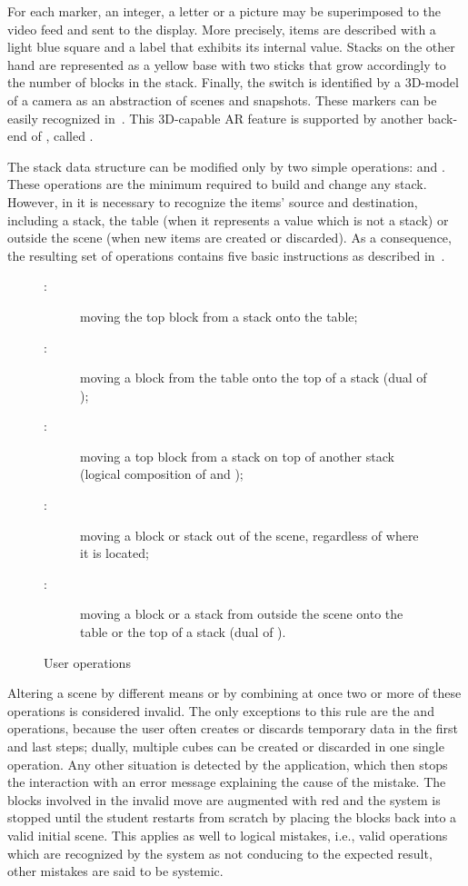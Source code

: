 For each marker, an integer, a letter or a picture may be superimposed
to the video feed and sent to the display. More precisely, items are
described with a light blue square and a label that exhibits its
internal value. Stacks on the other hand are represented as a yellow
base with two sticks that grow accordingly to the number of blocks in
the stack. Finally, the switch is identified by a 3D\hyp{}model of a
camera as an abstraction of scenes and snapshots. These markers can be
easily recognized in~. This 3D\hyp{}capable AR
feature is supported by another back\hyp{}end of \osgart, called \osg.

The stack data structure can be modified only by two simple
operations: \pop and \push. These operations are the minimum
required to build and change any stack. However, in \vestige it
is necessary to recognize the items' source and destination, including
a stack, the table (when it represents a value which is not a stack)
or outside the scene (when new items are created or discarded). As a
consequence, the resulting set of operations contains five basic
instructions as described in~.

\begin{figure}
  \begin{fminipage}{}
    \begin{description}
    \item[\pop:] moving the top block from a stack onto the table;
    \item[\push:] moving a block from the table onto the top of a
      stack (dual of \pop);
    \item[\poppush:] moving a top block from a stack on top of another
      stack (logical composition of \pop and \push);
    \item[\discard:] moving a block or stack out of the scene,
      regardless of where it is located;
    \item[\create:] moving a block or a stack from outside the scene
      onto the table or the top of a stack (dual of \discard).
    \end{description}
  \end{fminipage}
  \caption{User operations}
  \label{fig:list:actions}
\end{figure}

Altering a scene by different means or by combining at once two or
more of these operations is considered invalid. The only exceptions to
this rule are the \discard and \create operations, because the user
often creates or discards temporary data in the first and last steps;
dually, multiple cubes can be created or discarded in one single
operation. Any other situation is detected by the application, which
then stops the interaction with an error message explaining the cause
of the mistake. The blocks involved in the invalid move are augmented
with red and the system is stopped until the student restarts from
scratch by placing the blocks back into a valid initial scene. This
applies as well to logical mistakes, i.e., valid operations which are
recognized by the system as not conducing to the expected result,
other mistakes are said to be systemic.

